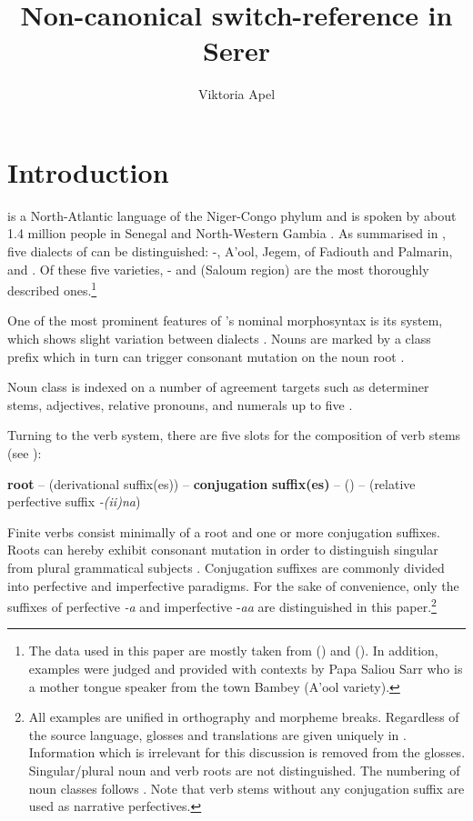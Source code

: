 \documentclass[output=paper
,newtxmath
,modfonts
,nonflat]{langsci/langscibook}
\title{Non-canonical switch-reference in Serer}
\author{Viktoria Apel\affiliation{Humboldt-Universität zu Berlin}}
\begin{document}
\maketitle

\section{Introduction}

 is a North-Atlantic language of the Niger-Congo phylum \citep{Segerer2016} and is spoken by about 1.4 million people in Senegal and North-Western Gambia \citep{SimonsFenning2017}. As summarised in \citet[4]{Renaudier2012}, five dialects of  can be distinguished: -,  A’ool,  Jegem,  of Fadiouth and Palmarin, and  . Of these five varieties, - and   (Saloum region) are the most thoroughly described ones.\footnote{The data used in this paper are mostly taken from \citet{Faye1979} () and \citet{Renaudier2012} (). In addition, examples were judged and provided with contexts by Papa Saliou Sarr who is a mother tongue speaker from the town Bambey (A’ool variety).}

One of the most prominent features of ’s nominal morphosyntax is its  system, which shows slight variation between dialects \citep[see][]{Renaudier2015}. Nouns are marked by a class prefix which in turn can trigger consonant mutation on the noun root \citep{Faye05,McLaughlin94,McLaughlin00,Merrill14,Pozdniakov2006}.

Noun class is indexed on a number of agreement targets such as determiner stems, adjectives, relative pronouns, and numerals up to five \citep[493]{Renaudier2015}.

Turning to the verb system, there are five slots for the composition of verb stems (see \citealt[][90]{FayeMous06}):

\ea\label{ex:apel:1}
\glt \textbf{root} – (derivational suffix(es)) – \textbf{conjugation} \textbf{suffix(es)} –   () – (relative perfective suffix \textit{-(ii)na})
\z

Finite verbs consist minimally of a root and one or more conjugation suffixes. Roots can hereby exhibit consonant mutation in order to distinguish singular from plural grammatical subjects \citep{McLaughlin94,McLaughlin00}. Conjugation suffixes are commonly divided into perfective and imperfective paradigms. For the sake of convenience, only the suffixes of perfective \textit{-a}  and imperfective -\textit{aa}  are distinguished in this paper.\footnote{All examples are unified in orthography and morpheme breaks. Regardless of the source language, glosses and translations are given uniquely in . Information which is irrelevant for this discussion is removed from the glosses. Singular/plural noun and verb roots are not distinguished. The numbering of noun classes follows \citet[118]{Faye1979}. Note that verb stems without any conjugation suffix are used as narrative perfectives.} 
\end{document}

